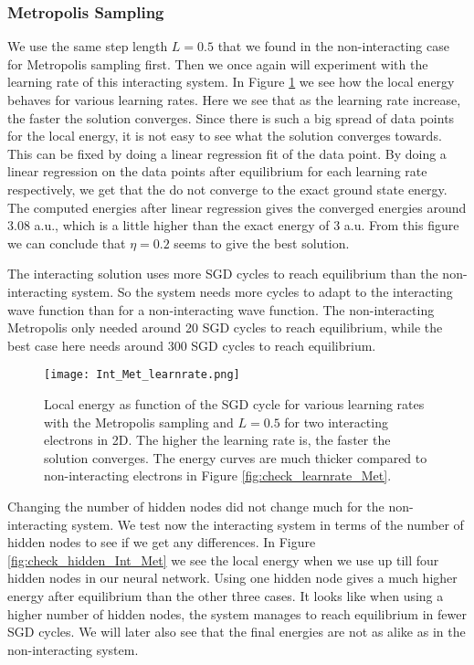\documentclass[12pt,a4paper,english]{article}
\begin{document}
\subsubsection{Metropolis Sampling}
\label{subsubsect:Results_int_Metropolis}
We use the same step length $L=0.5$ that we found in the non-interacting case for Metropolis sampling first. Then we once again will experiment with the learning rate of this interacting system. In Figure \ref{fig:check_learnrate_Int_Met} we see how the local energy behaves for various learning rates. Here we see that as the learning rate increase, the faster the solution converges. Since there is such a big spread of data points for the local energy, it is not easy to see what the solution converges towards. This can be fixed by doing a linear regression fit of the data point. By doing a linear regression on the data points after equilibrium for each learning rate respectively, we get that the do not converge to the exact ground state energy. The computed energies after linear regression gives the converged energies around 3.08 a.u., which is a little higher than the exact energy of 3 a.u. From this figure we can conclude that $\eta=0.2$ seems to give the best solution.

The interacting solution uses more SGD cycles to reach equilibrium than the non-interacting system. So the system needs more cycles to adapt to the interacting wave function than for a non-interacting wave function. The non-interacting Metropolis only needed around 20 SGD cycles to reach equilibrium, while the best case here needs around 300 SGD cycles to reach equilibrium.

\begin{figure}[ht!]
	\centering\texttt{[image: Int\_Met\_learnrate.png]}
	\caption{Local energy as function of the SGD cycle for various learning rates with the Metropolis sampling and $L=0.5$ for two interacting electrons in 2D. The higher the learning rate is, the faster the solution converges. The energy curves are much thicker compared to non-interacting electrons in Figure \ref{fig:check_learnrate_Met}. \label{fig:check_learnrate_Int_Met}}
\end{figure} 

\newpage
Changing the number of hidden nodes did not change much for the non-interacting system. We test now the interacting system in terms of the number of hidden nodes to see if we get any differences. In Figure 
\ref{fig:check_hidden_Int_Met} we see the local energy when we use up till four hidden nodes in our neural network. Using one hidden node gives a much higher energy after equilibrium than the other three cases. It looks like when using a higher number of hidden nodes, the system manages to reach equilibrium in fewer SGD cycles. We will later also see that the final energies are not as alike as in the non-interacting system.
\end{document}
